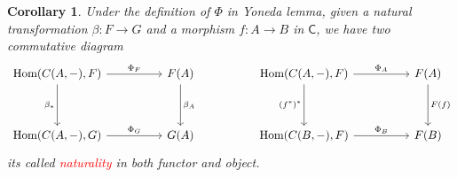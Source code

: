 \documentclass{article}
\newtheorem{corollary}[theorem]{Corollary}
\newcommand*{\cat}[1]{\textsf{#1}\xspace}
\newcommand{\redt}[1]{\textcolor{red}{#1}}
\begin{document}
\begin{corollary}
\rm Under the definition of $\Phi$ in Yoneda lemma, given a natural transformation $\beta: F \to G$ and a morphism $f:A \to B$ in $\cat{C}$, we have two commutative diagram
$$
\begin{tikzcd}
{\text{Hom}(C(A,-),F)} \arrow[rr, "\Phi_F"] \arrow[dd, "\beta_*"'] &  & F(A) \arrow[dd, "\beta_A"] &  & {\text{Hom}(C(A,-),F)} \arrow[rr, "\Phi_A"] \arrow[dd, "(f^*)^*"'] &  & F(A) \arrow[dd, "F(f)"] \\
                                                                   &  &                          &  &                                                                    &  &                         \\
{\text{Hom}(C(A,-),G)} \arrow[rr, "\Phi_G"]                        &  & G(A)                     &  & {\text{Hom}(C(B,-),F)} \arrow[rr, "\Phi_B"]                        &  & F(B)                   
\end{tikzcd}
$$
its called \redt{naturality} in both functor and object.   
\end{corollary}
\end{document}

